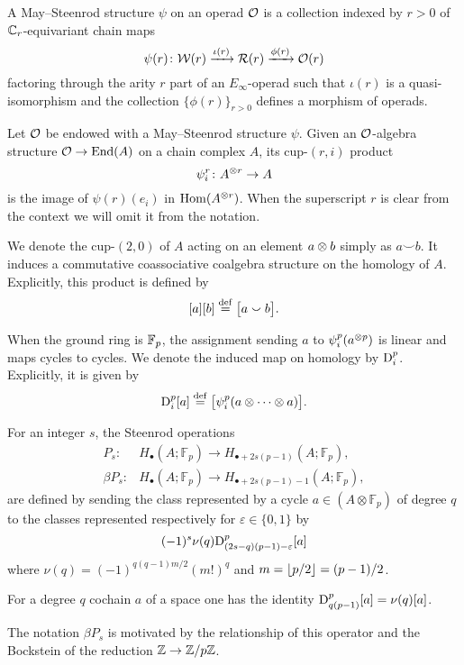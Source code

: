 \sssec

A May--Steenrod structure $\psi$ on an operad $\mathcal{O}$ is a collection indexed by $r>0$ of $\mathbb{C}_r$-equivariant chain maps
\[
\psi(r) \colon \mathcal{W}(r) \xrightarrow{\iota(r)} \mathcal{R}(r) \xrightarrow{\phi(r)} \mathcal{O}(r)
\]
factoring through the arity $r$ part of an $E_\infty$-operad such that $\iota(r)$ is a quasi-isomorphism and the collection $\{\phi(r)\}_{r>0}$ defines a morphism of operads.

\sssec

Let $\mathcal{O}$ be endowed with a May--Steenrod structure $\psi$.
Given an $\mathcal{O}$-algebra structure $\mathcal{O} \to \mathrm{End}(A)$ on a chain complex $A$, its cup-$(r,i)$ product
\[
\psi_i^r \colon A^{\otimes r} \to A
\]
is the image of $\psi(r)(e_i)$ in $\mathrm{Hom}(A^{\otimes r})$. %
When the superscript $r$ is clear from the context we will omit it from the notation.

\sssec

We denote the cup-$(2,0)$ of $A$ acting on an element $a \otimes b$ simply as $a \smallsmile b$.
It induces a commutative coassociative coalgebra structure on the homology of $A$.
Explicitly, this product is defined by
\[
[a][b] \stackrel{\mathrm{def}}{=} \big[a \smallsmile b\big].
\]

\sssec

When the ground ring is ${\mathbb{F}_p}$, the assignment sending $a$ to $\psi_i^p(a^{\otimes p})$ is linear and maps cycles to cycles.
We denote the induced map on homology by $\mathrm{D}_i^p$.
Explicitly, it is given by
\[
\mathrm{D}_i^p[a] \stackrel{\mathrm{def}}{=} \big[\psi_i^p(a \otimes\dotsb\otimes a)\big].
\]

\sssec

For an integer $s$, the Steenrod operations
\begin{align*}
	P_s \colon& H_\bullet(A; \mathbb{F}_p) \to H_{\bullet + 2s(p-1)}(A; \mathbb{F}_p), \\
	\beta P_s \colon& H_\bullet(A; \mathbb{F}_p) \to H_{\bullet + 2s(p-1) - 1}(A; \mathbb{F}_p),
\end{align*}
are defined by sending the class represented by a cycle $a \in (A \otimes \mathbb{F}_p)$ of degree $q$ to the classes represented respectively for $\varepsilon \in\{0,1\}$ by
\begin{equation*}
	(-1)^s \nu(q) \mathrm{D}^p_{(2s-q)(p-1)-\varepsilon}[a]
\end{equation*}
where $\nu(q) = (-1)^{q(q-1)m/2}(m!)^q$ and $m = \lfloor p/2\rfloor = (p-1)/2$.

\begin{remark*}
	For a degree $q$ cochain $a$ of a space one has the identity $\mathrm{D}_{q(p-1)}^p[a] = \nu(q)[a]$.
\end{remark*}

\begin{remark*}
	The notation $\beta P_s$ is motivated by the relationship of this operator and the Bockstein of the reduction $\mathbb{Z} \to \mathbb{Z}/p\mathbb{Z}$.
\end{remark*}